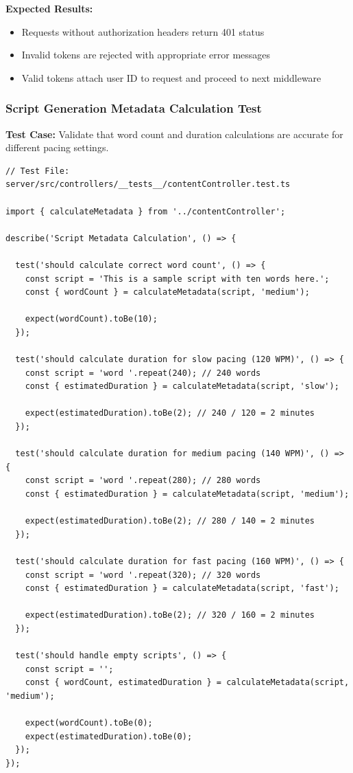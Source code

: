 \textbf{Expected Results:}
\begin{itemize}
    \item Requests without authorization headers return 401 status
    \item Invalid tokens are rejected with appropriate error messages
    \item Valid tokens attach user ID to request and proceed to next middleware
\end{itemize}

\subsubsection{Script Generation Metadata Calculation Test}

\textbf{Test Case:} Validate that word count and duration calculations are accurate for different pacing settings.

\begin{verbatim}
// Test File: server/src/controllers/__tests__/contentController.test.ts

import { calculateMetadata } from '../contentController';

describe('Script Metadata Calculation', () => {
  
  test('should calculate correct word count', () => {
    const script = 'This is a sample script with ten words here.';
    const { wordCount } = calculateMetadata(script, 'medium');
    
    expect(wordCount).toBe(10);
  });

  test('should calculate duration for slow pacing (120 WPM)', () => {
    const script = 'word '.repeat(240); // 240 words
    const { estimatedDuration } = calculateMetadata(script, 'slow');
    
    expect(estimatedDuration).toBe(2); // 240 / 120 = 2 minutes
  });

  test('should calculate duration for medium pacing (140 WPM)', () => {
    const script = 'word '.repeat(280); // 280 words
    const { estimatedDuration } = calculateMetadata(script, 'medium');
    
    expect(estimatedDuration).toBe(2); // 280 / 140 = 2 minutes
  });

  test('should calculate duration for fast pacing (160 WPM)', () => {
    const script = 'word '.repeat(320); // 320 words
    const { estimatedDuration } = calculateMetadata(script, 'fast');
    
    expect(estimatedDuration).toBe(2); // 320 / 160 = 2 minutes
  });

  test('should handle empty scripts', () => {
    const script = '';
    const { wordCount, estimatedDuration } = calculateMetadata(script, 'medium');
    
    expect(wordCount).toBe(0);
    expect(estimatedDuration).toBe(0);
  });
});
\end{verbatim}

